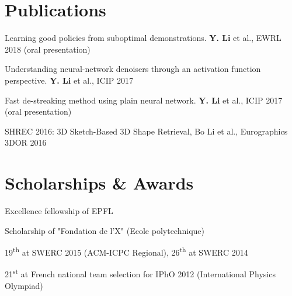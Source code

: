 \documentclass[a4paper,10pt]{article} %
\begin{document}
\section{Publications}

\begin{dinglist}{67} \itemsep -4pt
    \item Learning good policies from suboptimal demonstrations. \textbf{Y. Li} et al., EWRL 2018 (oral presentation)
    \item Understanding neural-network denoisers through an activation function perspective. \textbf{Y. Li} et al., ICIP 2017
    \item Fast de-streaking method using plain neural network. \textbf{Y. Li} et al., ICIP 2017 (oral presentation)
    \item SHREC 2016: 3D Sketch-Based 3D Shape Retrieval, Bo Li et al., Eurographics 3DOR 2016
\end{dinglist}


\section{Scholarships \& Awards}

\begin{dinglist}{67} \itemsep -4pt
    \item Excellence fellowship of EPFL
    \item Scholarship of "Fondation de l’X" (Ecole polytechnique)
    \item 19\textsuperscript{th} at SWERC 2015 (ACM-ICPC Regional), 26\textsuperscript{th} at SWERC 2014
    \item 21\textsuperscript{st} at French national team selection for IPhO 2012 (International Physics Olympiad)
\end{dinglist}


\end{document}
